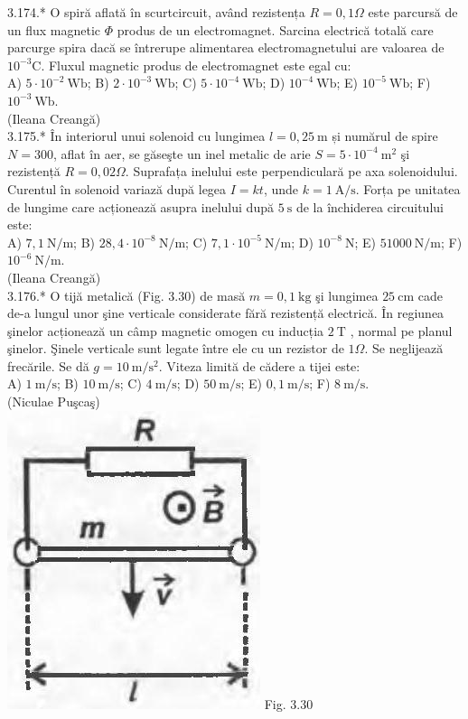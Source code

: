 3.174.* O spiră aflată în scurtcircuit, având rezistența $R=0,1 \Omega$ este parcursă de un flux magnetic $\Phi$ produs de un electromagnet. Sarcina electrică totală care parcurge spira dacă se întrerupe alimentarea electromagnetului are valoarea de $10^{-3} \mathrm{C}$. Fluxul magnetic produs de electromagnet este egal cu:\\ A) $5 \cdot 10^{-2} \mathrm{~Wb}$; B) $2 \cdot 10^{-3} \mathrm{~Wb}$; C) $5 \cdot 10^{-4} \mathrm{~Wb}$; D) $10^{-4} \mathrm{~Wb}$; E) $10^{-5} \mathrm{~Wb}$; F) $10^{-3} \mathrm{~Wb}$.\\ (Ileana Creangă)\\

3.175.* În interiorul unui solenoid cu lungimea $l=0,25 \mathrm{~m}$ și numărul de spire $N=300$, aflat în aer, se găseşte un inel metalic de arie $S=5 \cdot 10^{-4} \mathrm{~m}^{2}$ şi rezistență $R=0,02 \Omega$. Suprafața inelului este perpendiculară pe axa solenoidului. Curentul în solenoid variază după legea $I=k t$, unde $k=1 \mathrm{~A} / \mathrm{s}$. Forța pe unitatea de lungime care acționează asupra inelului după $5 \mathrm{~s}$ de la închiderea circuitului este:\\ A) $7,1 \mathrm{~N} / \mathrm{m}$; B) $28,4 \cdot 10^{-8} \mathrm{~N} / \mathrm{m}$; C) $7,1 \cdot 10^{-5} \mathrm{~N} / \mathrm{m}$; D) $10^{-8} \mathrm{~N}$; E) $51000 \mathrm{~N} / \mathrm{m}$; F) $10^{-6} \mathrm{~N} / \mathrm{m}$.\\ (Ileana Creangă)\\

3.176.* O tijă metalică (Fig. 3.30) de masă $m=0,1 \mathrm{~kg}$ şi lungimea $25 \mathrm{~cm}$ cade de-a lungul unor şine verticale considerate fără rezistență electrică. În regiunea şinelor acționează un câmp magnetic omogen cu inducția $2 \mathrm{~T}$ , normal pe planul şinelor. Şinele verticale sunt legate între ele cu un rezistor de $1 \Omega$. Se neglijează frecările. Se dă $g=10 \mathrm{~m} / \mathrm{s}^{2}$. Viteza limită de cădere a tijei este:\\ A) $1 \mathrm{~m} / \mathrm{s}$; B) $10 \mathrm{~m} / \mathrm{s}$; C) $4 \mathrm{~m} / \mathrm{s}$; D) $50 \mathrm{~m} / \mathrm{s}$; E) $0,1 \mathrm{~m} / \mathrm{s}$; F) $8 \mathrm{~m} / \mathrm{s}$.\\ (Niculae Puşcaş)\\ \includegraphics[width=0.4\linewidth]{images/2025_07_01_5b3ff9fa0d508c8e9f17g-183} Fig. 3.30\\

